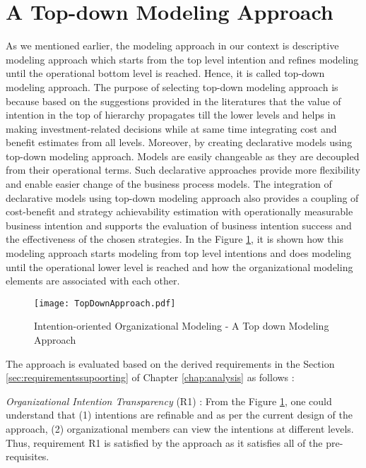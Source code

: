 \section{A Top-down Modeling Approach}
\label{sec:topdownapproach}
As we mentioned earlier, the modeling approach in our context is descriptive modeling approach which starts from the top level intention and refines modeling until the operational bottom level is reached. Hence, it is called top-down modeling approach. The purpose of selecting top-down modeling approach is because based on the suggestions provided in the literatures \cite{Mandic2010, Bider2005,Sungur2016} that the value of intention in the top of hierarchy propagates till the lower levels and helps in making investment-related decisions while at same time integrating cost and benefit estimates from all levels. Moreover, by creating declarative models using top-down modeling approach. Models are easily changeable as they are decoupled from their operational terms. Such declarative approaches provide more flexibility and enable easier change of the business process models. The integration of declarative models using top-down modeling approach also provides a coupling of cost-benefit and strategy achievability estimation with operationally measurable business intention and supports the evaluation of business intention success and the effectiveness of the chosen strategies. In the Figure \ref{fig:topdownapproach}, it is shown how this modeling approach starts modeling from top level intentions and does modeling until the operational lower level is reached and how the organizational modeling elements are associated with each other. 

\begin{figure}
	\centering
	\texttt{[image: TopDownApproach.pdf]}
	\caption{Intention-oriented Organizational Modeling - A Top down Modeling Approach}
	\label{fig:topdownapproach}
\end{figure}

The approach is evaluated based on the derived requirements in the Section \ref{sec:requirementssupoorting} of Chapter \ref{chap:analysis} as follows :

\textit{Organizational Intention Transparency} (R1) : From the Figure \ref{fig:topdownapproach}, one could understand that (1) intentions are refinable and as per the current design of the approach, (2) organizational members can view the intentions at different levels. Thus, requirement R1 is satisfied by the approach as it satisfies all of the pre-requisites. 

